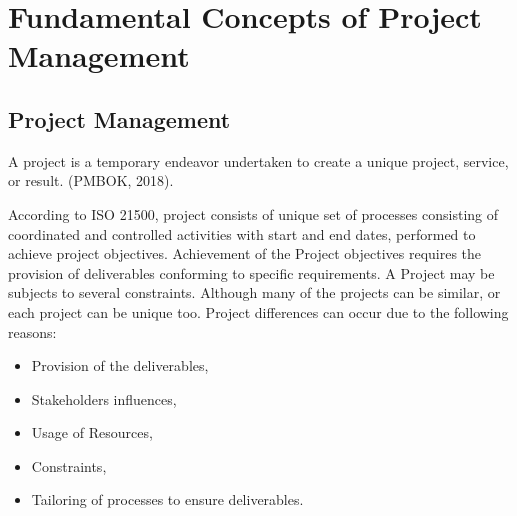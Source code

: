 %
%
\let\textcircled=\pgftextcircled
\chapter{Fundamental Concepts of Project Management}
\label{chap:intro}


 
 \section{Project Management}
 \label{sec:sec001}
 A project is a temporary endeavor undertaken to create a unique project, service, or result. (PMBOK, 2018).

According to ISO 21500, project consists of unique set of processes consisting of coordinated and controlled activities with start and end dates, performed to achieve project objectives. Achievement of the Project objectives requires the provision of deliverables conforming to specific requirements. A Project may be subjects to several constraints. Although many of the projects can be similar, or each project can be unique too. Project differences can occur due to the following reasons:
 \begin{itemize}
     \item Provision of the deliverables,
     \item Stakeholders influences, 
     \item Usage of Resources,
     \item Constraints,
     \item Tailoring of processes to ensure deliverables.
 \end{itemize}
     

